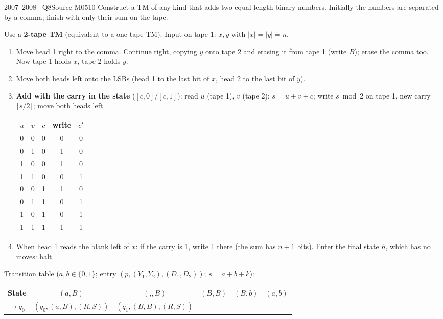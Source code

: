 \documentclass[11pt,a4paper]{article}
\begin{document}
\begin{question}{2007--2008 \textbullet\ Q8}{Source M05}{10}
Construct a TM of any kind that adds two equal-length binary numbers. Initially the numbers are separated by a comma; finish with only their sum on the tape.
\end{question}
\begin{solution}
Use a \textbf{2-tape TM} (equivalent to a one-tape TM). Input on tape 1: $x,y$ with $|x|=|y|=n$.
\begin{enumerate}
\item Move head 1 right to the comma. Continue right, copying $y$ onto tape 2 and erasing it from tape 1 (write $B$); erase the comma too. Now tape 1 holds $x$, tape 2 holds $y$.
\item Move both heads left onto the LSBs (head 1 to the last bit of $x$, head 2 to the last bit of $y$).
\item \textbf{Add with the carry in the state} ($[c,0]$/$[c,1]$): read $u$ (tape 1), $v$ (tape 2); $s=u+v+c$; write $s\bmod2$ on tape 1, new carry $\lfloor s/2\rfloor$; move both heads left.
\begin{center}\small\begin{tabular}{ccc|cc}\toprule $u$&$v$&$c$&write&$c'$\\\midrule 0&0&0&0&0\\0&1&0&1&0\\1&0&0&1&0\\1&1&0&0&1\\0&0&1&1&0\\0&1&1&0&1\\1&0&1&0&1\\1&1&1&1&1\\\bottomrule\end{tabular}\end{center}
\item When head 1 reads the blank left of $x$: if the carry is 1, write 1 there (the sum has $n+1$ bits). Enter the final state $h$, which has no moves: halt.
\end{enumerate}
Transition table ($a,b\in\{0,1\}$; entry $(p,(Y_1,Y_2),(D_1,D_2))$; $s=a+b+k$):
\begin{center}\footnotesize\setlength{\tabcolsep}{3pt}\begin{tabular}{l|ccccc}\toprule
State & $(a,B)$ & $(\text{,},B)$ & $(B,B)$ & $(B,b)$ & $(a,b)$\\\midrule
$\to q_0$ & $(q_0,(a,B),(R,S))$ & $(q_1,(B,B),(R,S))$ & & & \\

\end{tabular}
\end{center}
\end{solution}
\end{document}
